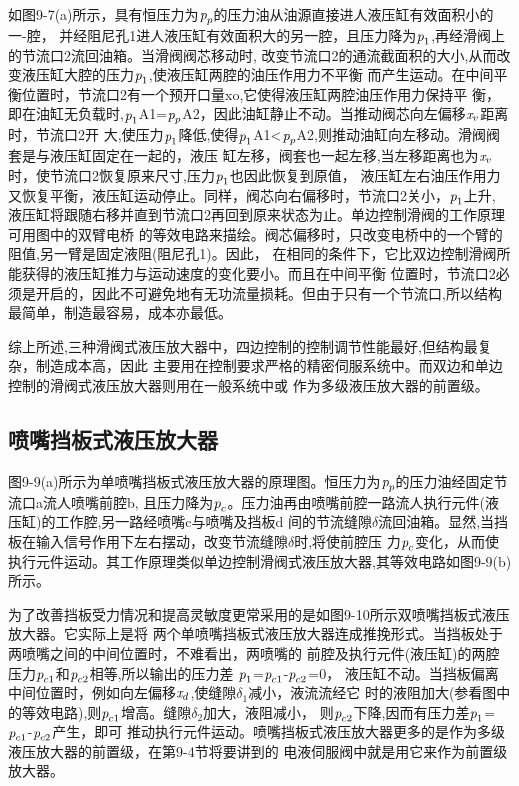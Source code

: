 如图9-7(a)所示，具有恒压力为$\emph{p}_p$的压力油从油源直接进人液压缸有效面积小的一-腔，
并经阻尼孔1进人液压缸有效面积大的另一腔，且压力降为$\emph{p}_1$,再经滑阀上的节流口2流回油箱。当滑阀阀芯移动时,
改变节流口2的通流截面积的大小,从而改变液压缸大腔的压力$\emph{p}_1$,使液压缸两腔的油压作用力不平衡
而产生运动。在中间平衡位置时，节流口2有一个预开口量xo,它使得液压缸两腔油压作用力保持平
衡，即在油缸无负载时,$\emph{p}_1$A1=$\emph{p}_p$A2，因此油缸静止不动。当推动阀芯向左偏移$\emph{x}_v$距离时，节流口2开
大,使压力$\emph{p}_1$降低,使得$\emph{p}_1$A1\textless $\emph{p}_p$A2,则推动油缸向左移动。滑阀阀套是与液压缸固定在一起的，液压
缸左移，阀套也一起左移,当左移距离也为$\emph{x}_v$时，使节流口2恢复原来尺寸,压力$\emph{p}_1$也因此恢复到原值，
液压缸左右油压作用力又恢复平衡，液压缸运动停止。同样，阀芯向右偏移时，节流口2关小，$\emph{p}_1$上升,
液压缸将跟随右移并直到节流口2再回到原来状态为止。单边控制滑阀的工作原理可用图中的双臂电桥
的等效电路来描绘。阀芯偏移时，只改变电桥中的一个臂的阻值,另一臂是固定液阻(阻尼孔1)。因此，
在相同的条件下，它比双边控制滑阀所能获得的液压缸推力与运动速度的变化要小。而且在中间平衡
位置时，节流口2必须是开启的，因此不可避免地有无功流量损耗。但由于只有一个节流口,所以结构
最简单，制造最容易，成本亦最低。

综上所述,三种滑阀式液压放大器中，四边控制的控制调节性能最好,但结构最复杂，制造成本高，因此
主要用在控制要求严格的精密伺服系统中。而双边和单边控制的滑阀式液压放大器则用在一般系统中或
作为多级液压放大器的前置级。
\subsection{喷嘴挡板式液压放大器}
图9-9(a)所示为单喷嘴挡板式液压放大器的原理图。恒压力为$\emph{p}_p$的压力油经固定节流口a流人喷嘴前腔b,
且压力降为$\emph{p}_c$。压力油再由喷嘴前腔一路流人执行元件(液压缸)的工作腔,另一路经喷嘴c与喷嘴及挡板d
间的节流缝隙$\delta$流回油箱。显然,当挡板在输入信号作用下左右摆动，改变节流缝隙$\delta$时,将使前腔压
力$\emph{p}_c$变化，从而使执行元件运动。其工作原理类似单边控制滑阀式液压放大器,其等效电路如图9-9(b)所示。

 为了改善挡板受力情况和提高灵敏度更常采用的是如图9-10所示双喷嘴挡板式液压放大器。它实际上是将
 两个单喷嘴挡板式液压放大器连成推挽形式。当挡板处于两喷嘴之间的中间位置时，不难看出，两喷嘴的
 前腔及执行元件(液压缸)的两腔压力$\emph{p}_{c1}$和$\emph{p}_{c2}$相等,所以输出的压力差
 $\emph{p}_1$=$\emph{p}_{c1}$-$\emph{p}_{c2}$=0，
 液压缸不动。当挡板偏离中间位置时，例如向左偏移$\emph{x}_d$,使缝隙$\delta_1$减小，液流流经它
 时的液阻加大(参看图中的等效电路),则$\emph{p}_{c1}$增高。缝隙$\delta_2$加大，液阻减小，
 则$\emph{p}_{c2}$下降,因而有压力差$\emph{p}_1$=$\emph{p}_{c1}$-$\emph{p}_{c2}$产生，即可
 推动执行元件运动。喷嘴挡板式液压放大器更多的是作为多级液压放大器的前置级，在第9-4节将要讲到的
 电液伺服阀中就是用它来作为前置级放大器。
